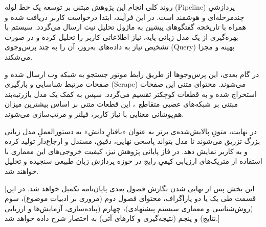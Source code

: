 
روند کلی انجام این پژوهش مبتنی بر توسعه یک خط لوله (Pipeline) پردازشیِ چندمرحله‌ای و هوشمند است. در این فرآیند، ابتدا درخواست کاربر دریافت شده و همراه با تاریخچه گفتگوهای پیشین به ماژول تحلیل نیت ارسال می‌گردد. سیستم با بهره‌گیری از یک مدل زبانی پایه، نیاز اطلاعاتی کاربر را تحلیل کرده و در صورت تشخیص نیاز به داده‌های به‌روز، آن را به چند پرس‌وجوی (Query) بهینه و مجزا می‌شکند. 

در گام بعدی، این پرس‌وجوها از طریق رابط موتور جستجو به شبکه وب ارسال شده و صفحات مرتبط شناسایی و بارگیری (Scrape) می‌شوند. محتوای متنی این صفحات استخراج شده و به قطعات کوچکتر تقسیم می‌گردد. سپس به کمک یک مدل بازرتبه‌بند مبتنی بر شبکه‌های عصبی متقاطع~، این قطعات متنی بر اساس بیشترین میزان هم‌پوشانی معنایی با نیاز کاربر، فیلتر و مرتب‌سازی می‌شوند. 

در نهایت، متونِ پالایش‌شده‌ی برتر به عنوان «بافتارِ دانش» به دستورالعملِ مدل زبانی بزرگ تزریق می‌شوند تا مدل بتواند پاسخی نهایی، دقیق، مستدل و ارجاع‌دار تولید کرده و به کاربر نمایش دهد. در فاز پایانی پژوهش نیز، کیفیت خروجی‌های این معماری با استفاده از متریک‌های ارزیابی کیفیِ رایج در حوزه پردازش زبان طبیعی سنجیده و تحلیل خواهند شد.


[این بخش پس از نهایی شدن نگارش فصول بعدی پایان‌نامه تکمیل خواهد شد. در این قسمت طی یک یا دو پاراگراف، محتوای فصول دوم (مروری بر ادبیات موضوع)، سوم (روش‌شناسی و معماری سیستم پیشنهادی)، چهارم (پیاده‌سازی، آزمایش‌ها و ارزیابی نتایج) و پنجم (نتیجه‌گیری و کارهای آتی) به اختصار شرح داده خواهد شد.]